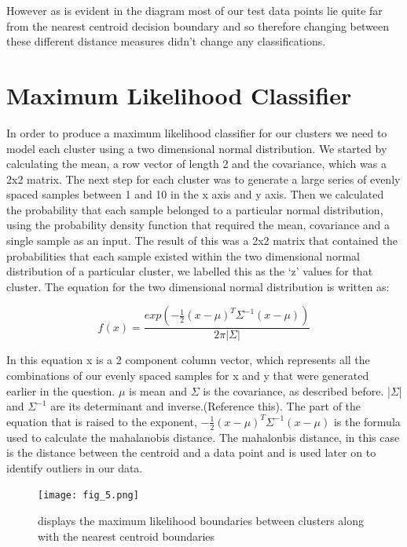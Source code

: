 \documentclass[A4Page,11pt]{article}
\begin{document}
However as is evident in the diagram most of our test data points lie quite far from the nearest centroid decision boundary and so therefore changing between these different distance measures didn’t change any classifications.

\section{Maximum Likelihood Classifier}
In order to produce a maximum likelihood classifier for our clusters we need to model each cluster using a two dimensional normal distribution. We started by calculating the mean, a row vector of length 2 and the covariance, which was a 2x2 matrix. The next step for each cluster was to generate a large series of evenly spaced samples between 1 and 10 in the x axis and y axis. Then we calculated the probability that each sample belonged to a particular normal distribution, using the probability density function that required the mean, covariance and a single sample as an input. The result of this was a 2x2 matrix that contained the probabilities that each sample existed within the two dimensional normal distribution of a particular cluster, we labelled this as the ‘z’ values for that cluster.
The equation for the two dimensional normal distribution is written as:

\[f(x)   = \frac{exp( -\frac{1}{2} (x - \mu)^ T \Sigma ^{-1} (x - \mu))}{2\pi |\Sigma|}\]
     

In this equation x is a 2 component column vector, which represents all the combinations of our evenly spaced samples for x and y that were generated earlier in the question. \(\mu\) is mean and  \(\Sigma\) is the covariance, as described before. |\(\Sigma\)| and \(\Sigma ^{-1}\) are its determinant and inverse.(Reference this). The part of the equation that is raised to the exponent, \(-\frac{1}{2} (x - \mu)^ T \Sigma ^{-1} (x - \mu)\) is the formula used to calculate the mahalanobis distance. The mahalonbis distance, in this case is the distance between the centroid and a data point and is used later on to identify outliers in our data.

\begin{figure}[h!]
\centering
\texttt{[image: fig\_5.png]}
\caption{\label{fig 5:}displays the maximum likelihood boundaries between clusters along with the nearest centroid boundaries
}
\end{figure}
\end{document}
